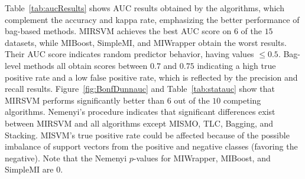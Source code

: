 \documentclass[preprint,12pt]{elsarticle}
\begin{document}
\begin{table}[b!]
{}\vspace{-0.6em}
\label{fig:BonfDunnauc}
\vspace{-0.5em}
\label{tab:statauc}
\scriptsize
{}
\end{table}
Table~\ref{tab:aucResults} shows AUC results obtained by the algorithms, which complement the accuracy and kappa rate, emphasizing the better performance of bag-based methods. MIRSVM achieves the best AUC score on $6$ of the $15$ datasets, while MIBoost, SimpleMI, and MIWrapper obtain the worst results. Their AUC score indicates random predictor behavior, having values $\leq 0.5$. Bag-level methods all obtain scores between $0.7$ and $0.75$ indicating a high true positive rate and a low false positive rate, which is reflected by the precision and recall results. Figure~\ref{fig:BonfDunnauc} and Table~\ref{tab:statauc} show that MIRSVM performs significantly better than $6$ out of the $10$ competing algorithms. Nemenyi's procedure indicates that significant differences exist between MIRSVM and all algorithms except MISMO, TLC, Bagging, and Stacking. MISVM's true positive rate could be affected because of the possible imbalance of support vectors from the positive and negative classes (favoring the negative). Note that the Nemenyi $p$-values for MIWrapper, MIBoost, and SimpleMI are $0$. 
\end{document}

